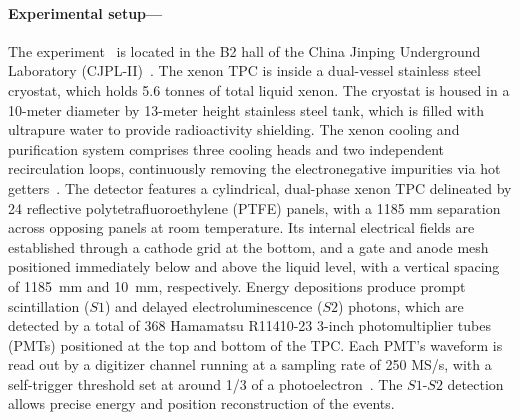 \documentclass[%
 reprint,
superscriptaddress,
 amsmath,amssymb,
 aps,
 prl,
]{revtex4-1}
\begin{document}
\paragraph{Experimental setup—} The \PX experiment~\cite{Zhang2019_P4Projection} is located in the B2 hall of the China Jinping Underground Laboratory (CJPL-II)~\cite{Kang2010, Li2014}.
The xenon TPC is inside a dual-vessel stainless steel cryostat, which holds 5.6 tonnes of total liquid xenon. The cryostat is housed in a 10-meter diameter by 13-meter height stainless steel tank, which is filled with ultrapure water to provide radioactivity shielding.
The xenon cooling and purification system comprises three cooling heads and two independent recirculation loops, continuously removing the electronegative impurities via hot getters~\cite{Zhao:2020vxh}. %
The detector features a cylindrical, dual-phase xenon TPC delineated by 24 reflective polytetrafluoroethylene (PTFE) panels, with a 1185 mm separation across opposing panels at room temperature.
Its internal electrical fields are established through a cathode grid at the bottom, and a gate and anode mesh positioned immediately below and above the liquid level, with a vertical spacing of 1185~mm and 10~mm, respectively.
Energy depositions produce prompt scintillation ($S1$) and delayed electroluminescence ($S2$) photons, which are detected by a total of 368 Hamamatsu R11410-23 3-inch photomultiplier tubes (PMTs) positioned at the top and bottom of the TPC. Each PMT's waveform is read out by a digitizer channel running at a sampling rate of 250 MS/s, with a self-trigger threshold set at around 1/3 of a photoelectron~\cite{Yang:2021hnn}. The $S1$-$S2$ detection allows precise energy and position reconstruction of the events.
\end{document}
